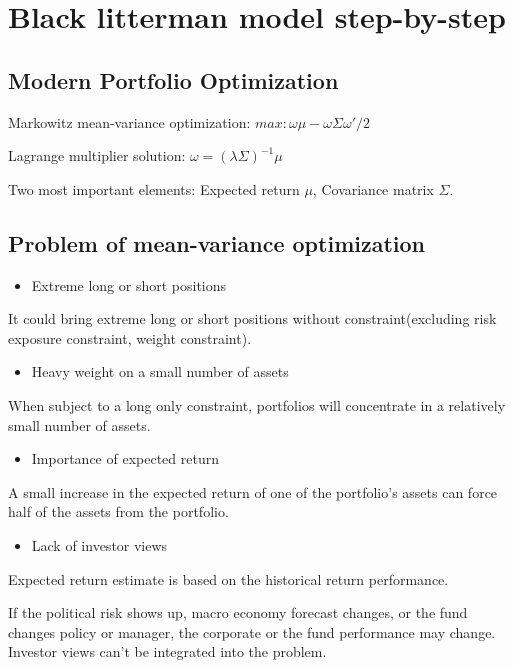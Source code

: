 \documentclass[presentation]{beamer}
\begin{document}
\section{Black litterman model step-by-step}
\label{sec:orgheadline34}
\subsection{Modern Portfolio Optimization}
\label{sec:orgheadline20}
Markowitz mean-variance optimization:
\(max: \omega\mu - \omega\Sigma\omega'/2\)

Lagrange multiplier solution: \(\omega=(\lambda\Sigma)^{-1}\mu\)

Two most important elements: Expected return \(\mu\), Covariance matrix \(\Sigma\).

\subsection{Problem of mean-variance optimization}
\label{sec:orgheadline21}
\begin{itemize}
\item Extreme long or short positions
\end{itemize}
It could bring extreme long or short positions without constraint(excluding risk exposure constraint, weight constraint).

\begin{itemize}
\item Heavy weight on a small number of assets
\end{itemize}
When subject to a long only constraint, portfolios will concentrate in a relatively small number of assets.

\begin{itemize}
\item Importance of expected return
\end{itemize}
A small increase in the expected return of one of the portfolio's assets can force half of the assets from the portfolio.

\begin{itemize}
\item Lack of investor views
\end{itemize}
Expected return estimate is based on the historical return performance.

If the political risk shows up, macro economy forecast changes, or the fund changes policy or manager, the corporate or the fund performance may change.
Investor views can't be integrated into the problem.
\end{document}
